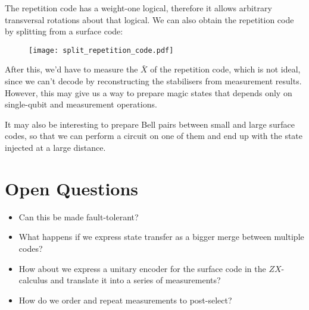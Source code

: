 \documentclass[a4paper, english]{scrartcl}
\begin{document}
The repetition code has a weight-one logical, therefore it allows arbitrary transversal rotations about that logical. 
We can also obtain the repetition code by splitting from a surface code:
\begin{figure}[!ht]
\centering
\texttt{[image: split\_repetition\_code.pdf]}
\end{figure}
\caption{How to split a repetition code off from a surface code.}
\FloatBarrier
After this, we'd have to measure the $\bar{X}$ of the repetition code, which is not ideal, since we can't decode by reconstructing the stabilisers from measurement results. 
However, this may give us a way to prepare magic states that depends only on single-qubit and measurement operations.

It may also be interesting to prepare Bell pairs between small and large surface codes, so that we can perform a circuit on one of them and end up with the state injected at a large distance. 
\section{Open Questions}
\begin{itemize}
\item Can this be made fault-tolerant?
\item What happens if we express state transfer as a bigger merge between multiple codes? 
\item How about we express a unitary encoder for the surface code in the $ZX$-calculus and translate it into a series of measurements?
\item How do we order and repeat measurements to post-select?
\end{itemize}
\end{document}
